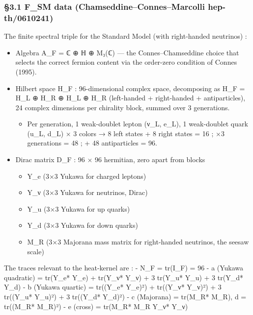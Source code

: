 \documentclass[
  11pt,
  a4paper,
]{article}
\providecommand{\tightlist}{\setlength{\itemsep}{0pt}\setlength{\parskip}{0pt}}
\providecommand{\tightlist}{%
  \setlength{\itemsep}{0pt}\setlength{\parskip}{0pt}}
\begin{document}
\hypertarget{f_sm-data-chamseddineconnesmarcolli-hep-th0610241}{%
\subsubsection{§3.1 F\_SM data (Chamseddine--Connes--Marcolli hep-th/0610241)}\label{f_sm-data-chamseddineconnesmarcolli-hep-th0610241}}

The finite spectral triple for the Standard Model (with right-handed neutrinos) :

\begin{itemize}
\tightlist
\item
  Algebra A\_F = ℂ ⊕ ℍ ⊕ M₃(ℂ) --- the Connes--Chamseddine choice that selects the correct fermion content via the order-zero condition of Connes (1995).
\item
  Hilbert space H\_F : 96-dimensional complex space, decomposing as H\_F = H\_L ⊕ H\_R ⊕ H\_L ⊕ H\_R (left-handed + right-handed + antiparticles), 24 complex dimensions per chirality block, summed over 3 generations.

  \begin{itemize}
  \tightlist
  \item
    Per generation, 1 weak-doublet lepton (ν\_L, e\_L), 1 weak-doublet quark (u\_L, d\_L) × 3 colors → 8 left states + 8 right states = 16 ; ×3 generations = 48 ; + 48 antiparticles = 96.
  \end{itemize}
\item
  Dirac matrix D\_F : 96 × 96 hermitian, zero apart from blocks

  \begin{itemize}
  \tightlist
  \item
    Y\_e (3×3 Yukawa for charged leptons)
  \item
    Y\_ν (3×3 Yukawa for neutrinos, Dirac)
  \item
    Y\_u (3×3 Yukawa for up quarks)
  \item
    Y\_d (3×3 Yukawa for down quarks)
  \item
    M\_R (3×3 Majorana mass matrix for right-handed neutrinos, the seesaw scale)
  \end{itemize}
\end{itemize}

The traces relevant to the heat-kernel are :
- N\_F = tr(I\_F) = 96
- a (Yukawa quadratic) = tr(Y\_e* Y\_e) + tr(Y\_ν* Y\_ν) + 3 tr(Y\_u* Y\_u) + 3 tr(Y\_d* Y\_d)
- b (Yukawa quartic) = tr((Y\_e* Y\_e)²) + tr((Y\_ν* Y\_ν)²) + 3 tr((Y\_u* Y\_u)²) + 3 tr((Y\_d* Y\_d)²)
- c (Majorana) = tr(M\_R* M\_R), d = tr((M\_R* M\_R)²)
- e (cross) = tr(M\_R* M\_R Y\_ν* Y\_ν)
\end{document}
